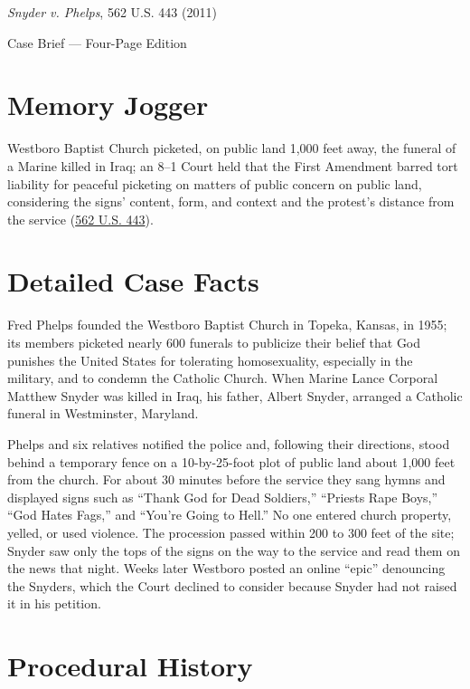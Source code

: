 \documentclass[12pt]{article}
\begin{document}
\begin{center}
{\LARGE \textit{Snyder v. Phelps}, 562 U.S. 443 (2011)\par}
\vspace{0.8em}
{\large Case Brief --- Four-Page Edition\par}
\end{center}
\vspace{1em}

\section{Memory Jogger}

Westboro Baptist Church picketed, on public land 1,000 feet away, the funeral of a Marine killed in Iraq; an 8--1 Court held that the First Amendment barred tort liability for peaceful picketing on matters of public concern on public land, considering the signs' content, form, and context and the protest's distance from the service (\href{https://supreme.justia.com/cases/federal/us/562/443/}{562 U.S. 443}).

\section{Detailed Case Facts}

Fred Phelps founded the Westboro Baptist Church in Topeka, Kansas, in 1955; its members picketed nearly 600 funerals to publicize their belief that God punishes the United States for tolerating homosexuality, especially in the military, and to condemn the Catholic Church. When Marine Lance Corporal Matthew Snyder was killed in Iraq, his father, Albert Snyder, arranged a Catholic funeral in Westminster, Maryland.

Phelps and six relatives notified the police and, following their directions, stood behind a temporary fence on a 10-by-25-foot plot of public land about 1,000 feet from the church. For about 30 minutes before the service they sang hymns and displayed signs such as ``Thank God for Dead Soldiers,'' ``Priests Rape Boys,'' ``God Hates Fags,'' and ``You're Going to Hell.'' No one entered church property, yelled, or used violence. The procession passed within 200 to 300 feet of the site; Snyder saw only the tops of the signs on the way to the service and read them on the news that night. Weeks later Westboro posted an online ``epic'' denouncing the Snyders, which the Court declined to consider because Snyder had not raised it in his petition.

\section{Procedural History}
\end{document}
